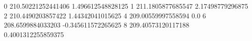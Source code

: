 0 210.50221252441406 1.496612548828125
1 211.1805877685547 2.17498779296875
2 210.4490203857422 1.44342041015625
4 209.00559997558594 0.0
6 208.6599884033203 -0.345611572265625
8 209.40573120117188 0.4001312255859375
